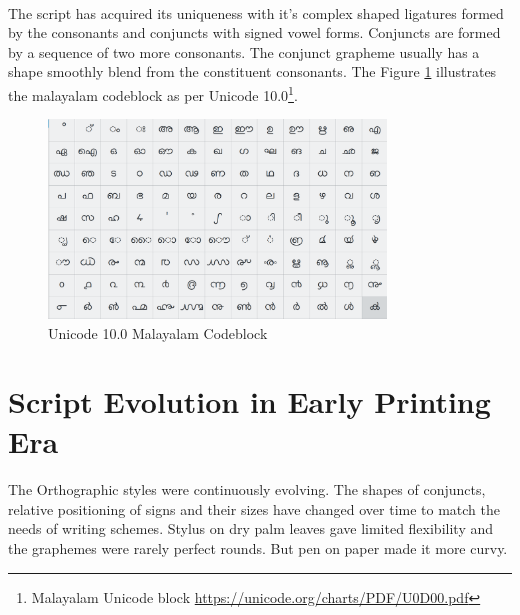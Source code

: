 \documentclass[10pt]{article}
\begin{document}
\paragraph{}
The script has acquired its uniqueness with it's complex shaped ligatures formed by the consonants and conjuncts with signed vowel forms. Conjuncts are formed by a sequence of two more consonants. The conjunct grapheme usually has a shape smoothly blend from the constituent consonants. The Figure \ref{unicode} illustrates the malayalam codeblock as per Unicode 10.0\footnote{Malayalam Unicode block \url{https://unicode.org/charts/PDF/U0D00.pdf}}. 


\begin{figure}[h!]
	\centering
	\includegraphics[width=0.8\textwidth]{images/unicodeml.png}
	\caption{Unicode 10.0 Malayalam Codeblock}
	\label{unicode}
\end{figure} 

\section{Script Evolution in Early Printing Era}

\paragraph{}
The Orthographic styles were continuously evolving. The shapes of conjuncts, relative positioning of signs and their sizes have changed over time to match the needs of writing schemes. Stylus on dry palm leaves gave limited flexibility and the graphemes were rarely perfect rounds. But pen on paper made it more curvy. 
\end{document}
